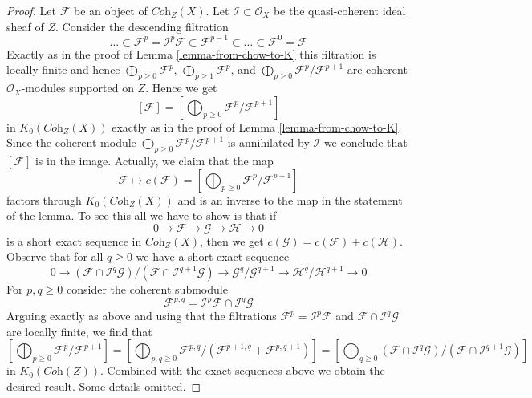 \begin{proof}
Let $\mathcal{F}$ be an object of $\textit{Coh}_Z(X)$.
Let $\mathcal{I} \subset \mathcal{O}_X$ be the quasi-coherent
ideal sheaf of $Z$. Consider the descending filtration
$$
\ldots \subset
\mathcal{F}^p = \mathcal{I}^p \mathcal{F} \subset
\mathcal{F}^{p - 1} \subset \ldots \subset \mathcal{F}^0 = \mathcal{F}
$$
Exactly as in the proof of Lemma \ref{lemma-from-chow-to-K} this filtration
is locally finite and hence
$\bigoplus_{p \geq 0} \mathcal{F}^p$,
$\bigoplus_{p \geq 1} \mathcal{F}^p$, and
$\bigoplus_{p \geq 0} \mathcal{F}^p/\mathcal{F}^{p + 1}$
are coherent $\mathcal{O}_X$-modules supported on $Z$.
Hence we get
$$
[\mathcal{F}] =
[\bigoplus\nolimits_{p \geq 0} \mathcal{F}^p/\mathcal{F}^{p + 1}]
$$
in $K_0(\textit{Coh}_Z(X))$ exactly as in the proof of
Lemma \ref{lemma-from-chow-to-K}. Since the coherent module
$\bigoplus_{p \geq 0} \mathcal{F}^p/\mathcal{F}^{p + 1}$
is annihilated by $\mathcal{I}$ we conclude that
$[\mathcal{F}]$ is in the image. Actually, we claim that the map
$$
\mathcal{F} \longmapsto 
c(\mathcal{F}) =
[\bigoplus\nolimits_{p \geq 0} \mathcal{F}^p/\mathcal{F}^{p + 1}]
$$
factors through $K_0(\textit{Coh}_Z(X))$ and is an inverse to
the map in the statement of the lemma. To see this all we have
to show is that if
$$
0 \to \mathcal{F} \to \mathcal{G} \to \mathcal{H} \to 0
$$
is a short exact sequence in $\textit{Coh}_Z(X)$, then we
get $c(\mathcal{G}) = c(\mathcal{F}) + c(\mathcal{H})$.
Observe that for all $q \geq 0$ we have a short exact sequence
$$
0 \to
(\mathcal{F} \cap \mathcal{I}^q\mathcal{G})/
(\mathcal{F} \cap \mathcal{I}^{q + 1}\mathcal{G}) \to
\mathcal{G}^q/\mathcal{G}^{q + 1} \to
\mathcal{H}^q/\mathcal{H}^{q + 1} \to 0
$$
For $p, q \geq 0$ consider the coherent submodule
$$
\mathcal{F}^{p, q} = \mathcal{I}^p\mathcal{F} \cap \mathcal{I}^q\mathcal{G}
$$
Arguing exactly as above and using that the filtrations
$\mathcal{F}^p = \mathcal{I}^p\mathcal{F}$ and
$\mathcal{F} \cap \mathcal{I}^q\mathcal{G}$ are locally finite,
we find that
$$
[\bigoplus\nolimits_{p \geq 0} \mathcal{F}^p/\mathcal{F}^{p + 1}] =
[\bigoplus\nolimits_{p, q \geq 0}
\mathcal{F}^{p, q}/(\mathcal{F}^{p + 1, q} + \mathcal{F}^{p, q + 1})] =
[\bigoplus\nolimits_{q \geq 0}
(\mathcal{F} \cap \mathcal{I}^q\mathcal{G})/
(\mathcal{F} \cap \mathcal{I}^{q + 1}\mathcal{G})]
$$
in $K_0(\textit{Coh}(Z))$. Combined with the exact sequences above we obtain
the desired result. Some details omitted.
\end{proof}













